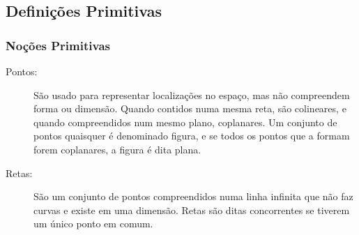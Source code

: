 \subsection{Definições Primitivas}
    \subsubsection{Noções Primitivas}
        \begin{description}
            \item[Pontos:]
                São usado para representar localizações no espaço, mas não compreendem forma ou dimensão. Quando contidos numa mesma reta, são colineares, e quando compreendidos num mesmo plano, coplanares.
                Um conjunto de pontos quaisquer é denominado figura, e se todos os pontos que a formam forem coplanares, a figura é dita plana. \eg
                \begin{center}
                \end{center}
            \item[Retas:]
                São um conjunto de pontos compreendidos numa linha infinita que não faz curvas e existe em uma dimensão. Retas são ditas concorrentes se tiverem um único ponto em comum. \eg
                \begin{center}
\end{center}
\end{description}
